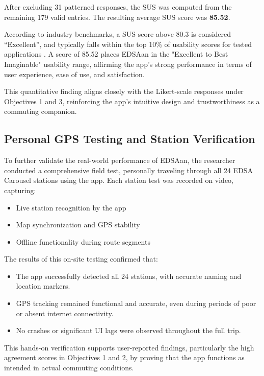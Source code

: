 \documentclass{icsthesis}
\begin{document}
\begin{mainmatter}
After excluding 31 patterned responses, the SUS was computed from the remaining 179 valid entries. The resulting average SUS score was \textbf{85.52}.

According to industry benchmarks, a SUS score above 80.3 is considered “Excellent”, and typically falls within the top 10\% of usability scores for tested applications \citep{Ref:019}. A score of 85.52 places EDSAan in the "Excellent to Best Imaginable" usability range, affirming the app’s strong performance in terms of user experience, ease of use, and satisfaction.

This quantitative finding aligns closely with the Likert-scale responses under Objectives 1 and 3, reinforcing the app's intuitive design and trustworthiness as a commuting companion.

\subsection{Personal GPS Testing and Station Verification}

To further validate the real-world performance of EDSAan, the researcher conducted a comprehensive field test, personally traveling through all 24 EDSA Carousel stations using the app. Each station test was recorded on video, capturing:

\begin{itemize}
    \item Live station recognition by the app
    \item Map synchronization and GPS stability
    \item Offline functionality during route segments
\end{itemize}

The results of this on-site testing confirmed that:
\begin{itemize}
\item The app successfully detected all 24 stations, with accurate naming and location markers.

\item GPS tracking remained functional and accurate, even during periods of poor or absent internet connectivity.

\item No crashes or significant UI lags were observed throughout the full trip.
\end{itemize}

This hands-on verification supports user-reported findings, particularly the high agreement scores in Objectives 1 and 2, by proving that the app functions as intended in actual commuting conditions.


\end{mainmatter}
\end{document}
